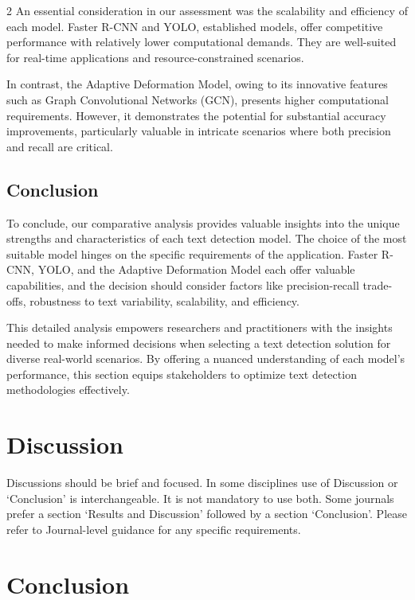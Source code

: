 \documentclass[sn-mathphys,Numbered]{sn-jnl}%
\begin{document}
\begin{multicols}{2}
An essential consideration in our assessment was the scalability and efficiency of each model. Faster R-CNN and YOLO, established models, offer competitive performance with relatively lower computational demands. They are well-suited for real-time applications and resource-constrained scenarios.

In contrast, the Adaptive Deformation Model, owing to its innovative features such as Graph Convolutional Networks (GCN), presents higher computational requirements. However, it demonstrates the potential for substantial accuracy improvements, particularly valuable in intricate scenarios where both precision and recall are critical.

\subsection{Conclusion}
To conclude, our comparative analysis provides valuable insights into the unique strengths and characteristics of each text detection model. The choice of the most suitable model hinges on the specific requirements of the application. Faster R-CNN, YOLO, and the Adaptive Deformation Model each offer valuable capabilities, and the decision should consider factors like precision-recall trade-offs, robustness to text variability, scalability, and efficiency.

This detailed analysis empowers researchers and practitioners with the insights needed to make informed decisions when selecting a text detection solution for diverse real-world scenarios. By offering a nuanced understanding of each model's performance, this section equips stakeholders to optimize text detection methodologies effectively.


\section{Discussion}\label{sec12}

Discussions should be brief and focused. In some disciplines use of Discussion or `Conclusion' is interchangeable. It is not mandatory to use both. Some journals prefer a section `Results and Discussion' followed by a section `Conclusion'. Please refer to Journal-level guidance for any specific requirements. 

\section{Conclusion}\label{sec13}


\end{multicols}
\end{document}
